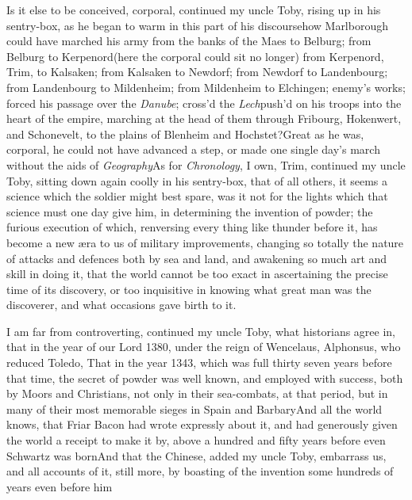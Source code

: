 \documentclass{article}
\begin{document}
Is it else to be conceived, corporal, continued my uncle
Toby, rising up in his sentry-box, as he began to warm in
this part of his discourse\tsk how Marlborough could have
marched his army from the banks of the Maes to
Belburg; from Belburg to Kerpenord\tsk (here the
corporal could sit no longer) from Kerpenord, Trim, to
Kalsaken; from Kalsaken to Newdorf; from
Newdorf to Landenbourg; from Landenbourg to
Mildenheim; from Mildenheim to Elchingen; 
enemy’s works; forced his passage over the \textit{Danube}; cross’d the
\textit{Lech}\tsk push’d on his troops into the heart of the empire, marching at the
head of them through Fribourg, Hokenwert, and Schonevelt, to the plains of Blenheim
and Hochstet?\break\null\tsh Great as he was, corporal, he could
not have advanced a step, or made one single day’s march without the aids of\break
\textit{Geography}\tsh As for \textit{Chronology}, I own, Trim, continued my uncle
Toby, sitting down again coolly in his sentry-box, that of all others, it seems a
science which the soldier might best spare, was it not for the lights which that
science must one day give him, in determining the invention of powder; the furious
execution of which, renversing every thing like thunder before it, has become a new
æra to us of military improvements, changing so totally the nature of attacks and
defences both by sea and land, and awakening so much art and skill in doing it, that
the world cannot be too exact in ascertaining the precise time of its discovery, or
too inquisitive in knowing what great man was the discoverer, and what occasions
gave birth to it.

I am far from controverting, conti\-nued my uncle Toby,
what historians agree in, that in the year of our Lord 1380, under
the reign of Wencelaus, 
Alphonsus, who reduced Toledo, That in the year
1343, which was full thirty seven years before that time, the secret of powder was
well known, and employed with success, both by Moors and Christians, not only in
their sea-combats, at that period, but in many of their most memorable sieges in
Spain and Barbary\tsk\break And all the world knows, that Friar Bacon had wrote expressly
about it, and had generously given the world a receipt to make it by, above a
hundred and fifty years before even Schwartz was born\tsk And that the Chinese,
added my uncle Toby, embarrass us, and all accounts of it, still more, by boasting
of the invention some hundreds of years even before him\tsh
\end{document}

